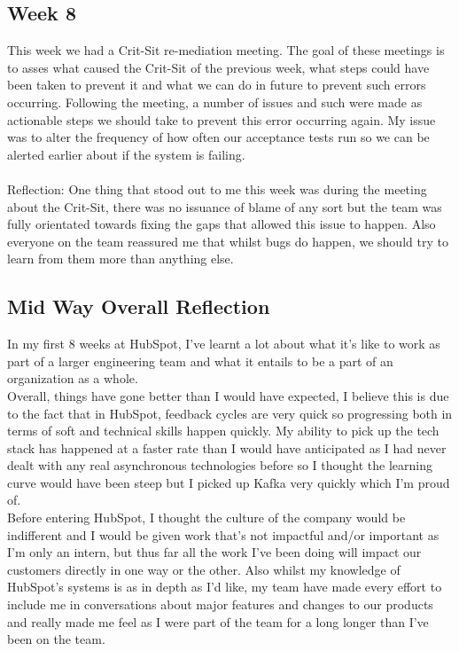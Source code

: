 \documentclass[12pt]{article} %
\begin{document}
\subsection{Week 8}
This week we had a Crit-Sit re-mediation meeting.  The goal of these meetings is to asses what caused the Crit-Sit of the previous week,  what steps could have been taken to prevent it and what we can do in future to prevent such errors occurring.  Following the meeting,  a number of issues and such were made as actionable steps we should take to prevent this error occurring again.  My issue was to alter the frequency of how often our acceptance tests run so we can be alerted earlier about if the system is failing. 
\\\\ Reflection: One thing that stood out to me this week was during the meeting about the Crit-Sit,  there was no issuance of blame of any sort but the team was fully orientated towards fixing the gaps that allowed this issue to happen.   Also everyone on the team reassured me that whilst bugs do happen, we should try to learn from them more than anything else.
\subsection{Mid Way Overall Reflection}
In my first 8 weeks at HubSpot,  I've learnt a lot about what it's like to work as part of a larger engineering team and what it entails to be a part of an organization as a whole.  \\ Overall, things have gone better than I would have expected,  I believe this is due to the fact that in HubSpot, feedback cycles are very quick so progressing both in terms of soft and technical skills happen quickly.  My ability to pick up the tech stack has happened at a faster rate than I would have anticipated as I had never dealt with any real asynchronous technologies before so I thought the learning curve would have been steep but I picked up Kafka very quickly which I'm proud of. \\ Before entering HubSpot, I thought the culture of the company would be indifferent and I would be given work that's not impactful and/or important as I'm only an intern, but thus far all the work I've been doing will impact our customers directly in one way or the other. Also whilst my knowledge of HubSpot's systems is as in depth as I'd like, my team have made every effort to include me in conversations about major features and changes to our products and really made me feel as I were part of the team for a long longer than I've been on the team. 
\newpage
\end{document}
